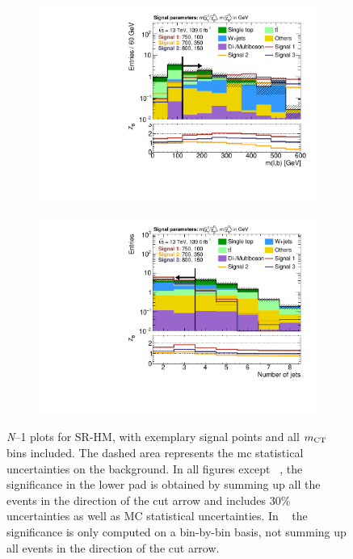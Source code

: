 \begin{figure}
\begin{subfigure}[b]{0.45\linewidth}
		\centering\includegraphics[width=\textwidth]{n1_SRHM_mct_bins/mlb1.pdf}
		\vspace{-2em}
		\caption{\label{fig:Wh_reopt_second_round_n1_srhm_mlb1}}
	\end{subfigure}%
	\begin{subfigure}[b]{0.45\linewidth}
		\centering\includegraphics[width=\textwidth]{n1_SRHM_mct_bins/nJet30.pdf}
		\vspace{-2em}
		\caption{\label{fig:Wh_reopt_second_round_n1_srhm_njet}}
	\end{subfigure}
	\caption{\textit{N}--1 plots for SR-HM, with exemplary signal points and all $m_{\textrm{CT}}$ bins included. The dashed area represents the \gls{mc} statistical uncertainties on the background. In all figures except \figname~, the significance in the lower pad is obtained by summing up all the events in the direction of the cut arrow and includes 30\% uncertainties as well as MC statistical uncertainties. In \figname~ the significance is only computed on a bin-by-bin basis, \ie not summing up all events in the direction of the cut arrow.}
	\label{fig:Wh_reopt_second_round_n1_srhm}
\end{figure}




